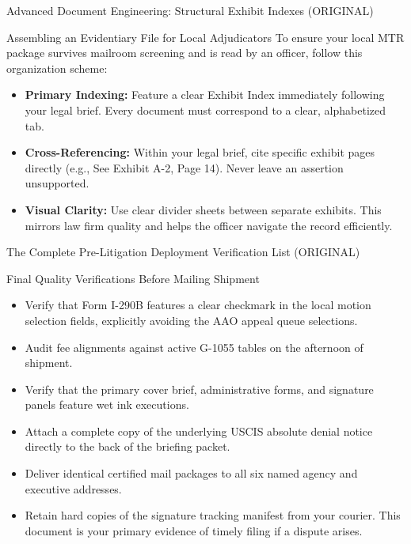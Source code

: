 \documentclass[11pt]{beamer}
\begin{document}
	\begin{frame}{Advanced Document Engineering: Structural Exhibit Indexes (ORIGINAL)}
		\scriptsize
		\begin{block}{Assembling an Evidentiary File for Local Adjudicators}
			To ensure your local MTR package survives mailroom screening and is read by an officer, follow this organization scheme:
			\begin{itemize}
				\item \textbf{Primary Indexing:} Feature a clear Exhibit Index immediately following your legal brief. Every document must correspond to a clear, alphabetized tab.
				\item \textbf{Cross-Referencing:} Within your legal brief, cite specific exhibit pages directly (e.g., See Exhibit A-2, Page 14). Never leave an assertion unsupported.
				\item \textbf{Visual Clarity:} Use clear divider sheets between separate exhibits. This mirrors law firm quality and helps the officer navigate the record efficiently.
			\end{itemize}
		\end{block}
	\end{frame}
	
	\begin{frame}{The Complete Pre-Litigation Deployment Verification List (ORIGINAL)}
		\scriptsize
		\begin{block}{Final Quality Verifications Before Mailing Shipment}
			\begin{itemize}
				\item [$\square$] Verify that Form I-290B features a clear checkmark in the local motion selection fields, explicitly avoiding the AAO appeal queue selections.
				\item [$\square$] Audit fee alignments against active G-1055 tables on the afternoon of shipment.
				\item [$\square$] Verify that the primary cover brief, administrative forms, and signature panels feature wet ink executions.
				\item [$\square$] Attach a complete copy of the underlying USCIS absolute denial notice directly to the back of the briefing packet.
				\item [$\square$] Deliver identical certified mail packages to all six named agency and executive addresses.
				\item [$\square$] Retain hard copies of the signature tracking manifest from your courier. This document is your primary evidence of timely filing if a dispute arises.
			\end{itemize}
		\end{block}
	\end{frame}
	
\end{document}

